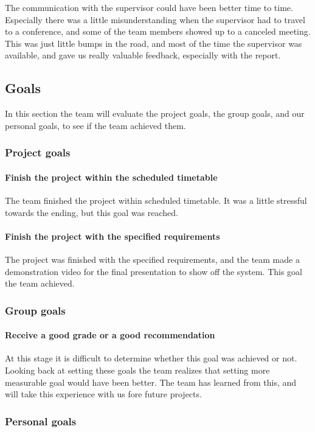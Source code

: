 The communication with the supervisor could have been better time to time. Especially there was a little misunderstanding when the supervisor had to travel to a conference, and some of the team members showed up to a canceled meeting. This was just little bumps in the road, and most of the time the supervisor was available, and gave us really valuable feedback, especially with the report. 

\subsection{Goals} 
In this section the team will evaluate the project goals, the group goals, and our personal goals, to see if the team achieved them. 

\subsubsection{Project goals}
\paragraph{Finish the project within the scheduled timetable}
The team finished the project within scheduled timetable. It was a little stressful towards the ending, but this goal was reached.
\paragraph{Finish the project with the specified requirements}
The project was finished with the specified requirements, and the team made a demonstration video for the final presentation to show off the system. This goal the team achieved. 

\subsubsection{Group goals}
\paragraph{Receive a good grade or a good recommendation}
At this stage it is difficult to determine whether this goal was achieved or not. Looking back at setting these goals the team realizes that setting more measurable goal would have been better. The team has learned from this, and will take this experience with us fore future projects.

\subsubsection{Personal goals}


